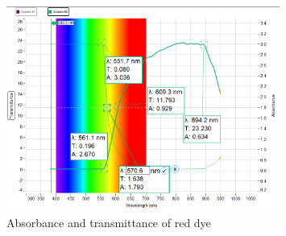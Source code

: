 \begin{figure}[H]
    \centering
    \includegraphics[width=0.8\textwidth]{Results/absorption_spectrometry/red.png}
    \caption{Absorbance and transmittance of red dye}
    \label{fig:red_spectrum}
\end{figure}